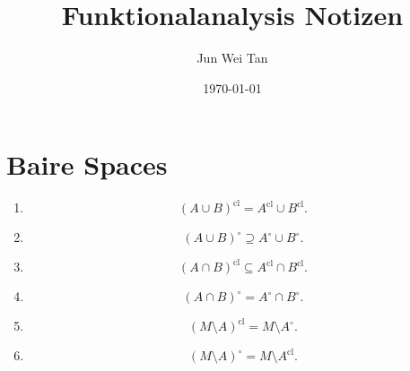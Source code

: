 \documentclass[prb,12pt]{revtex4-2}
\theoremstyle{definition}
\theoremstyle{definition}
\theoremstyle{definition}
\newenvironment{parts}{\begin{enumerate}[label=(\alph*)]}{\end{enumerate}}
\begin{document}
	\title{Funktionalanalysis Notizen}
	\author{Jun Wei Tan}
	\date{\today}
	\maketitle
	\section{Baire Spaces}
	\begin{Theorem}
		\noindent
		\begin{parts}
			\item
			\[(A\cup B)^\text{cl}=A^\text{cl}\cup B^\text{cl}.\]
			\item 
			\[
			(A\cup B)^{\circ}\supseteq A^\circ \cup B^\circ
			.\] 
			\item \[
			(A\cap B)^\text{cl}\subseteq A^\text{cl}\cap B^\text{cl}
			.\]
			\item 	\[
			(A\cap B)^\circ = A^\circ \cap B^\circ
			.\] 
			\item \[
			(M\setminus A)^\text{cl}=M\setminus A^{\circ}
			.\]
			\item \[
			(M\setminus A)^\circ = M \setminus A^\text{cl}
			.\] 
		\end{parts}
	\end{Theorem}
\end{document}
